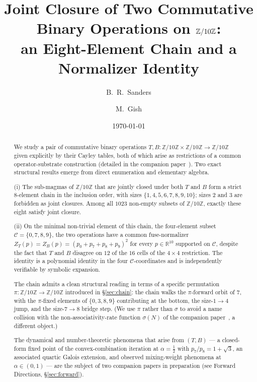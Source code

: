 \documentclass[11pt,reqno]{amsart}
\title[Joint closure on $\Zten$]{Joint Closure of Two Commutative Binary
Operations on $\Zten$:\\ an Eight-Element Chain and a Normalizer Identity}
\author{B.~R.~Sanders}
\author{M.~Gish}
\date{\today}
\theoremstyle{plain}
\theoremstyle{definition}
\theoremstyle{remark}
\newcommand{\Z}{\mathbb{Z}}
\newcommand{\R}{\mathbb{R}}
\newcommand{\Zten}{\Z/10\Z}
\newcommand{\Cfour}{\mathcal{C}}
\begin{document}
\begin{abstract}
We study a pair of commutative binary operations
$T,B:\Zten\times\Zten\to\Zten$ given explicitly by their Cayley
tables, both of which arise as restrictions of a common
operator-substrate construction (detailed in the companion
paper~\cite{SandersGish2026Sigma}). Two exact structural results
emerge from direct enumeration and elementary algebra.

(i) The sub-magmas of $\Zten$ that are jointly closed under
both $T$ and $B$ form a strict $8$-element chain in the inclusion
order, with sizes $\{1, 4, 5, 6, 7, 8, 9, 10\}$; sizes $2$ and $3$
are forbidden as joint closures. Among all $1023$ non-empty
subsets of $\Zten$, exactly these eight satisfy joint closure.

(ii) On the minimal non-trivial element of this chain, the
four-element subset $\Cfour=\{0,7,8,9\}$, the two operations have
a common fuse-normalizer
$Z_{T}(p)=Z_{B}(p)=(p_{0}+p_{7}+p_{8}+p_{9})^{2}$ for every
$p\in\R^{10}$ supported on $\Cfour$, despite the fact that $T$
and $B$ disagree on $12$ of the $16$ cells of the $4\times 4$
restriction. The identity is a polynomial identity in the four
$\Cfour$-coordinates and is independently verifiable by symbolic
expansion.

The chain admits a clean structural reading in terms of a
specific permutation $\pi:\Zten\to\Zten$ introduced in
\S\ref{sec:chain}: the chain walks the $\pi$-forward orbit of
$7$, with the $\pi$-fixed elements of $\{0,3,8,9\}$ contributing
at the bottom, the size-$1\to 4$ jump, and the size-$7\to 8$
bridge step. (We use $\pi$ rather than $\sigma$ to avoid a name
collision with the non-associativity-rate function $\sigma(N)$
of the companion paper~\cite{SandersGish2026Sigma}, a different
object.)

The dynamical and number-theoretic phenomena that arise from
$(T,B)$ --- a closed-form fixed point of the convex-combination
iteration at $\alpha=\tfrac12$ with $p_{7}/p_{8}=1+\sqrt{3}$, an
associated quartic Galois extension, and observed
mixing-weight phenomena at $\alpha\in(0,1)$ --- are the subject
of two companion papers in preparation
(see Forward Directions, \S\ref{sec:forward}).
\end{abstract}

\maketitle

\end{document}
